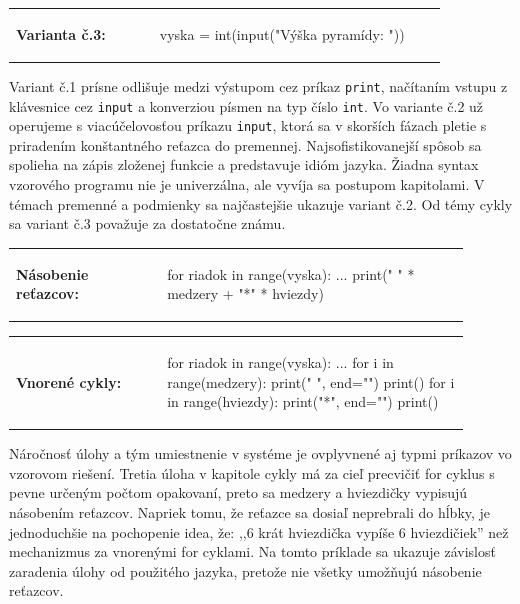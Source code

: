 \vspace{-2em}
\begin{tabular}{@{}p{0.3\linewidth}p{0.6\linewidth}}
\textbf{\small Varianta č.3:} &
\vspace{-1em}
\begin{solution}
vyska = int(input("Výška pyramídy: "))
\end{solution}
\end{tabular}

Variant č.1 prísne odlišuje medzi výstupom cez príkaz \verb|print|, načítaním vstupu z klávesnice cez \verb|input| a konverziou písmen na typ číslo \verb|int|. Vo variante č.2 už operujeme s viacúčelovosťou príkazu \verb|input|, ktorá sa v skorších fázach pletie s priradením konštantného reťazca do premennej. Najsofistikovanejší spôsob sa spolieha na zápis zloženej funkcie a predstavuje idióm jazyka. Žiadna syntax vzorového programu nie je univerzálna, ale vyvíja sa postupom kapitolami. V témach premenné a podmienky sa najčastejšie ukazuje variant č.2. Od témy cykly sa variant č.3 považuje za dostatočne známu.

\begin{tabular}{@{}p{0.3\linewidth}p{0.6\linewidth}}
\textbf{\small Násobenie reťazcov:} &
\vspace{-1em}
\begin{solution}
for riadok in range(vyska):
	...
	print(" " * medzery + "*" * hviezdy)
\end{solution}
\end{tabular}

\vspace{-2em}
\begin{tabular}{@{}p{0.3\linewidth}p{0.6\linewidth}}
\textbf{\small Vnorené cykly:} &
\vspace{-1em}
\begin{solution}
for riadok in range(vyska):
	...
	for i in range(medzery):
		print(" ", end="")
	print()
	for i in range(hviezdy):
		print("*", end="")
	print()
\end{solution}
\end{tabular}

Náročnosť úlohy a tým umiestnenie v systéme je ovplyvnené aj typmi príkazov vo vzorovom riešení. Tretia úloha v kapitole cykly má za cieľ precvičiť for cyklus s pevne určeným počtom opakovaní, preto sa medzery a hviezdičky vypisujú násobením reťazcov. Napriek tomu, že reťazce sa dosiaľ neprebrali do hĺbky, je jednoduchšie na pochopenie idea, že: ,,6 krát hviezdička vypíše 6 hviezdičiek'' než mechanizmus za vnorenými for cyklami. Na tomto príklade sa ukazuje závislosť zaradenia úlohy od použitého jazyka, pretože nie všetky umožňujú násobenie reťazcov.

